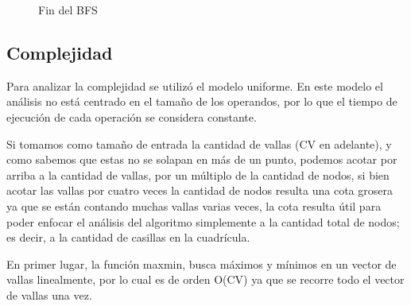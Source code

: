 \documentclass[a4paper, 12pt]{article}
\begin{document}
\begin{figure}[H]
\centering
{}
\qquad
{}
\qquad
{}
\caption{Fin del BFS}
\end{figure}


\subsection*{Complejidad}
Para analizar la complejidad se utilizó el modelo uniforme. En este modelo el análisis no está centrado en el tama\~{n}o de los operandos, por lo que el tiempo de ejecución de cada operación se considera constante.

Si tomamos como tama\~no de entrada la cantidad de vallas (CV en adelante), y como sabemos que estas no se solapan en más de un punto, podemos acotar por arriba a la cantidad de vallas, por un múltiplo de la cantidad de nodos, si bien acotar las vallas por cuatro veces la cantidad de nodos resulta una cota grosera ya que se están contando muchas vallas varias veces, la cota resulta útil para poder enfocar el análisis del algoritmo simplemente a la cantidad total de nodos; es decir, a la cantidad de casillas en la cuadrícula.

En primer lugar, la función maxmin, busca máximos y mínimos en un vector de vallas linealmente, por lo cual es de orden O(CV) ya que se recorre todo el vector de vallas una vez.
\end{document}
